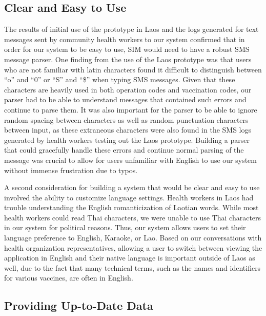 \documentclass{acm_proc_article-sp}
\begin{document}
\subsection{Clear and Easy to Use}

The results of initial use of the prototype in Laos and the logs generated for text messages sent by community health workers to our system confirmed that in order for our system to be easy to use, SIM would need to have a robust SMS message parser. One finding from the use of the Laos prototype was that users who are not familiar with latin characters found it difficult to distinguish between ``o'' and ``0'' or ``S'' and ``\$'' when typing SMS messages. Given that these characters are heavily used in both operation codes and vaccination codes, our parser had to be able to understand messages that contained such errors and continue to parse them. It was also important for the parser to be able to ignore random spacing between characters as well as random punctuation characters between input, as these extraneous characters were also found in the SMS logs generated by health workers testing out the Laos prototype. Building a parser that could gracefully handle these errors and continue normal parsing of the message was crucial to allow for users unfamiliar with English to use our system without immense frustration due to typos.

A second consideration for building a system that would be clear and easy to use involved the ability to customize language settings. Health workers in Laos had trouble understanding the English romanticization of Laotian words. While most health workers could read Thai characters, we were unable to use Thai characters in our system for political reasons. Thus, our system allows users to set their language preference to English, Karaoke, or Lao. Based on our conversations with health organization representatives, allowing a user to switch between viewing the application in English and their native language is important outside of Laos as well, due to the fact that many technical terms, such as the names and identifiers for various vaccines, are often in English.

\subsection{Providing Up-to-Date Data}
\end{document}
